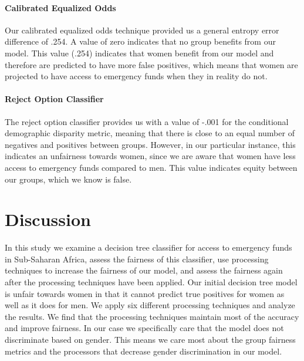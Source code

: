 \documentclass[water,article,submit,moreauthors,pdftex]{mdpi}
\begin{document}
\hypertarget{calibrated-equalized-odds}{%
\paragraph{Calibrated Equalized Odds}\label{calibrated-equalized-odds}}

Our calibrated equalized odds technique provided us a general entropy
error difference of .254. A value of zero indicates that no group
benefits from our model. This value (.254) indicates that women benefit
from our model and therefore are predicted to have more false positives,
which means that women are projected to have access to emergency funds
when they in reality do not.

\hypertarget{reject-option-classifier}{%
\paragraph{Reject Option Classifier}\label{reject-option-classifier}}

The reject option classifier provides us with a value of -.001 for the
conditional demographic disparity metric, meaning that there is close to
an equal number of negatives and positives between groups. However, in
our particular instance, this indicates an unfairness towards women,
since we are aware that women have less access to emergency funds
compared to men. This value indicates equity between our groups, which
we know is false.

\hypertarget{discussion}{%
\section{Discussion}\label{discussion}}

In this study we examine a decision tree classifier for access to
emergency funds in Sub-Saharan Africa, assess the fairness of this
classifier, use processing techniques to increase the fairness of our
model, and assess the fairness again after the processing techniques
have been applied. Our initial decision tree model is unfair towards
women in that it cannot predict true positives for women as well as it
does for men. We apply six different processing techniques and analyze
the results. We find that the processing techniques maintain most of the
accuracy and improve fairness. In our case we specifically care that the
model does not discriminate based on gender. This means we care most
about the group fairness metrics and the processors that decrease gender
discrimination in our model.
\end{document}
